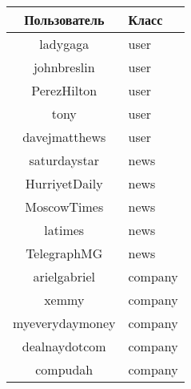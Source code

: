 \label{table:unc}
\begin{tabular}[t]{|c|l|}
\hline
Пользователь & Класс \\
\hline
ladygaga & user \\
\hline
johnbreslin & user \\
\hline
PerezHilton & user \\
\hline
tony & user \\
\hline
davejmatthews & user \\
\hline
saturdaystar & news \\
\hline
HurriyetDaily & news \\
\hline
MoscowTimes & news \\
\hline
latimes & news \\
\hline
TelegraphMG & news \\
\hline
arielgabriel & company \\
\hline
xemmy & company \\
\hline
myeverydaymoney & company \\
\hline
dealnaydotcom & company \\
\hline
compudah & company \\
\hline
\end{tabular}
